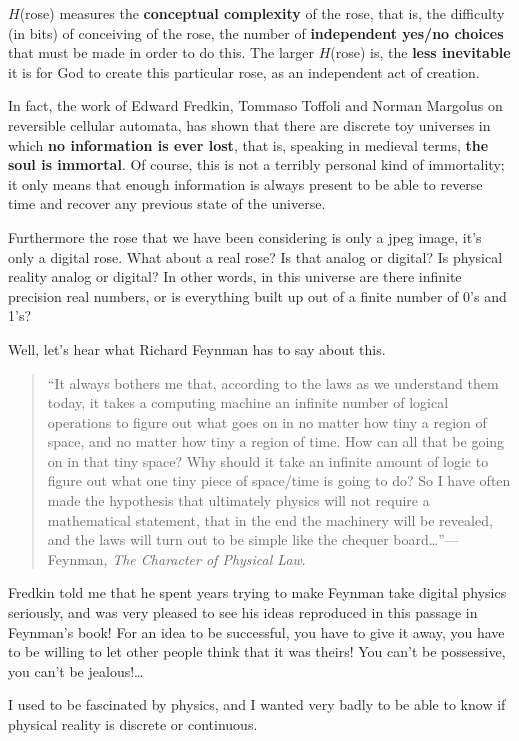 \documentclass[12pt]{book}
\begin{document}
$H$(rose) measures the \textbf{conceptual complexity} of the rose,
that is, the difficulty (in bits) of conceiving of the rose,
the number of \textbf{independent yes/no choices} that must be made in order to do this.
The larger $H$(rose) is, the \textbf{less inevitable} it is for God to
create this particular rose, as an independent act of creation.
 
In fact, the work of Edward Fredkin, Tommaso Toffoli and Norman Margolus
on reversible cellular automata, has shown that there are
discrete toy universes in which \textbf{no information is
ever lost}, that is, speaking in medieval terms, \textbf{the soul is immortal}.  
Of course, this is not a terribly personal kind of immortality; it only
means that enough information is always present to be able to reverse time and recover 
any previous state of the universe.
 
Furthermore
the rose that we have been considering is only a jpeg image, it's
only a digital rose. What about a real rose? Is that analog or digital?
Is physical reality analog or digital?
In other words,
in this universe
are there infinite precision real numbers, or is everything built up out of a finite number
of 0's and 1's?
 
Well, let's hear what Richard Feynman has to say about this.
\begin{quotation}
``It always bothers me that, according to the laws as we understand them today,
it takes a computing machine an infinite number of logical operations to
figure out what goes on in no matter how tiny a region of space, and no
matter how tiny a region of time. How can all that be going on in that tiny space?
Why should it take an infinite amount of logic to figure out what one tiny
piece of space/time is going to do?
So I have often made the hypothesis that ultimately physics will not require
a mathematical statement, that in the end the machinery will be revealed,
and the laws will turn out to be simple like the chequer board\ldots''---Feynman,
\emph{The Character of Physical Law}.
\end{quotation}
Fredkin told me that he spent years trying to make Feynman
take digital physics seriously, 
and was very pleased to see his ideas reproduced in this passage in Feynman's book!
For an idea to be successful, you have to give it away, you have to 
be willing to 
let other people
think that it was theirs!
You can't be possessive, you can't be jealous!\ldots
 
I used to be fascinated by physics, and I wanted very badly to be able to know if physical
reality is discrete or continuous.
 
\end{document}
